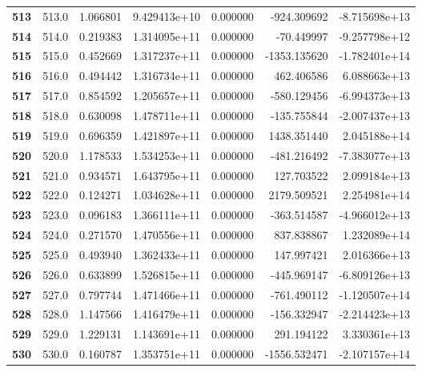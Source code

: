 \documentclass{report}[12pt]
\begin{document}
\begin{center}
\begin{tabular}{lrrrrrr}
\textbf{513 } &          513.0 &   1.066801 &  9.429413e+10 &    0.000000 &  -924.309692 & -8.715698e+13 \\
\textbf{514 } &          514.0 &   0.219383 &  1.314095e+11 &    0.000000 &   -70.449997 & -9.257798e+12 \\
\textbf{515 } &          515.0 &   0.452669 &  1.317237e+11 &    0.000000 & -1353.135620 & -1.782401e+14 \\
\textbf{516 } &          516.0 &   0.494442 &  1.316734e+11 &    0.000000 &   462.406586 &  6.088663e+13 \\
\textbf{517 } &          517.0 &   0.854592 &  1.205657e+11 &    0.000000 &  -580.129456 & -6.994373e+13 \\
\textbf{518 } &          518.0 &   0.630098 &  1.478711e+11 &    0.000000 &  -135.755844 & -2.007437e+13 \\
\textbf{519 } &          519.0 &   0.696359 &  1.421897e+11 &    0.000000 &  1438.351440 &  2.045188e+14 \\
\textbf{520 } &          520.0 &   1.178533 &  1.534253e+11 &    0.000000 &  -481.216492 & -7.383077e+13 \\
\textbf{521 } &          521.0 &   0.934571 &  1.643795e+11 &    0.000000 &   127.703522 &  2.099184e+13 \\
\textbf{522 } &          522.0 &   0.124271 &  1.034628e+11 &    0.000000 &  2179.509521 &  2.254981e+14 \\
\textbf{523 } &          523.0 &   0.096183 &  1.366111e+11 &    0.000000 &  -363.514587 & -4.966012e+13 \\
\textbf{524 } &          524.0 &   0.271570 &  1.470556e+11 &    0.000000 &   837.838867 &  1.232089e+14 \\
\textbf{525 } &          525.0 &   0.493940 &  1.362433e+11 &    0.000000 &   147.997421 &  2.016366e+13 \\
\textbf{526 } &          526.0 &   0.633899 &  1.526815e+11 &    0.000000 &  -445.969147 & -6.809126e+13 \\
\textbf{527 } &          527.0 &   0.797744 &  1.471466e+11 &    0.000000 &  -761.490112 & -1.120507e+14 \\
\textbf{528 } &          528.0 &   1.147566 &  1.416479e+11 &    0.000000 &  -156.332947 & -2.214423e+13 \\
\textbf{529 } &          529.0 &   1.229131 &  1.143691e+11 &    0.000000 &   291.194122 &  3.330361e+13 \\
\textbf{530 } &          530.0 &   0.160787 &  1.353751e+11 &    0.000000 & -1556.532471 & -2.107157e+14 \\

\end{tabular}
\end{center}
\end{document}
